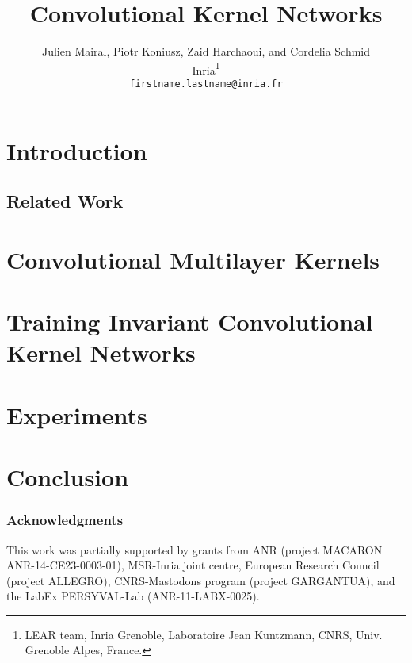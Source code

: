 \documentclass{article} %
\title{Convolutional Kernel Networks}
\author{
   Julien Mairal, Piotr Koniusz, Zaid Harchaoui, and Cordelia Schmid \\
   Inria\thanks{LEAR team, Inria Grenoble, Laboratoire Jean Kuntzmann, CNRS, Univ. Grenoble Alpes, France.} \\
   \texttt{firstname.lastname@inria.fr}
}
\begin{document}
\maketitle

\begin{abstract}
   
\end{abstract}

\section{Introduction}


\subsection{Related Work}\label{sec:related}


\section{Convolutional Multilayer Kernels}\label{sec:scattering}


\section{Training Invariant Convolutional Kernel Networks}\label{sec:approx}


\section{Experiments}\label{sec:exp}


\vs
\section{Conclusion}\label{sec:ccl}


\vsb
\subsubsection*{Acknowledgments}
\vsb
This work was partially supported by grants from ANR (project MACARON ANR-14-CE23-0003-01),
MSR-Inria joint centre, European Research Council (project ALLEGRO), CNRS-Mastodons program (project GARGANTUA), and the LabEx PERSYVAL-Lab (ANR-11-LABX-0025).

\newpage
\small{
   
   
}
 \appendix
 
\end{document}
